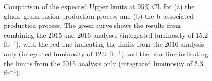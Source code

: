 \begin{figure}[h!]
\begin{center}
\end{center}
\caption{Comparison of the expected Upper limits at 95\% CL for (a) the gluon--gluon fusion production
process and (b) the b--associated production process. The green curve shows the results
from combining the 2015 and 2016 analyses (integrated luminosity of 15.2 fb$^{-1}$),
with the red line indicating the limits from the 2016 analysis only (integrated luminosity of 12.9 fb$^{-1}$)
and the blue line indicating the limits from the 2015 analysis only (integrated luminosity of 2.3 fb$^{-1}$).}
\label{fig:mssm_results_combination_limits_comp}
\end{figure}




